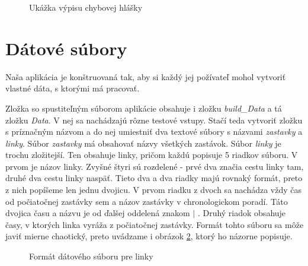 \begin{figure}[H]
  \caption{Ukážka výpisu chybovej hlášky}
  \label{ukazka_chyby}
\end{figure}


\section{Dátové súbory}

Naša aplikácia je konštruovaná tak, aby si každý jej požívateľ mohol vytvoriť vlastné dáta, s ktorými má pracovať.\newline

Zložka so spustiteľným súborom aplikácie obsahuje i zložku \textit{build\_Data} a tá zložku \textit{Data}. V nej sa nachádzajú rôzne testové vstupy. Stačí teda vytvoriť zložku s príznačným názvom a do nej umiestniť dva textové súbory s názvami \textit{zastavky} a \textit{linky}. Súbor \textit{zastavky} má obsahovať názvy všetkých zastávok. Súbor \textit{linky} je trochu zložitejší. Ten obsahuje linky, pričom každú popisuje 5 riadkov súboru. V prvom je názov linky. Zvyšné štyri sú rozdelené - prvé dva značia cestu linky tam, druhé dva cestu linky naspäť. Tieto dva a dva riadky majú rovnaký formát, preto z nich popíšeme len jednu dvojicu. V prvom riadku z dvoch sa nachádza vždy čas od počiatočnej zastávky sem a názov zastávky v chronologickom poradí. Táto dvojica času a názvu je od ďalšej oddelená znakom $|$ . Druhý riadok obsahuje časy, v ktorých linka vyráža z počiatočnej zastávky. Formát tohto súboru sa môže javiť mierne chaotický, preto uvádzame i obrázok \ref{Format_datoveho_suboru1}, ktorý ho názorne popisuje.\newline

\begin{figure}[H]
  \caption{Formát dátového súboru pre linky}
  \label{Format_datoveho_suboru1}
\end{figure}

